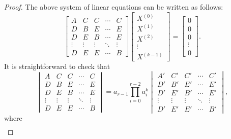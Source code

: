 \documentclass[conference]{IEEEtran}
\begin{document}
\begin{proof}
   The above system of linear equations can be written as follows:
   {\small \begin{equation}
       \begin{bmatrix}
           A&C&C&\cdots&C\\
           D&B&E&\cdots&E\\
           D&E&B&\cdots&E\\
           \vdots&\vdots&\vdots&\ddots&\vdots\\
           D&E&E&\cdots&B
       \end{bmatrix}\begin{bmatrix}
           X^{(0)}\\
           X^{(1)}\\
           X^{(2)}\\
           \vdots\\
            X^{(k-1)}
       \end{bmatrix}=\begin{bmatrix}
           0\\
           0\\
           0\\
           \vdots\\
            0
       \end{bmatrix}.
   \end{equation}}
	It is straightforward to check that 
   {\small \begin{equation}\label{deteq}
        \begin{vmatrix}
           A&C&C&\cdots&C\\
           D&B&E&\cdots&E\\
           D&E&B&\cdots&E\\
           \vdots&\vdots&\vdots&\ddots&\vdots\\
           D&E&E&\cdots&B 
        \end{vmatrix}= a_{r-1}\prod_{i=0}^{r-2}a_{i}^{k}\begin{vmatrix}
           A'&C'&C'&\cdots&C'\\
           D'&B'&E'&\cdots&E'\\
           D'&E'&B'&\cdots&E'\\
           \vdots&\vdots&\vdots&\ddots&\vdots\\
           D'&E'&E'&\cdots&B' 
        \end{vmatrix},
    \end{equation}}
    where
    \vspace{-0.25cm}
    \begin{align*}

\end{align*}
\end{proof}
\end{document}
